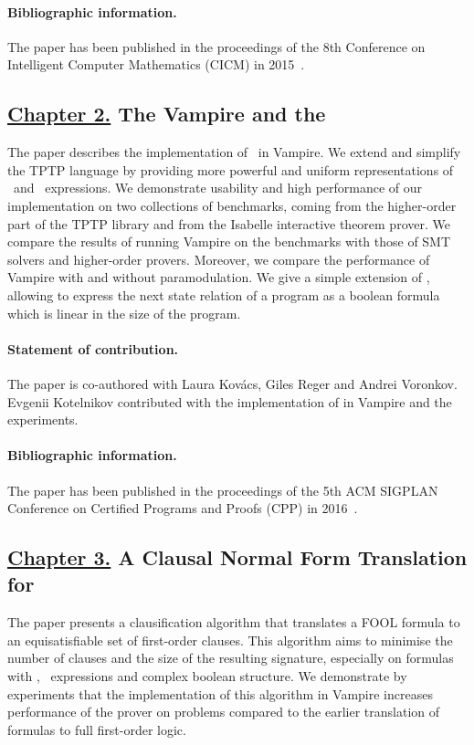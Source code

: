 \paragraph{Bibliographic information.} The paper has been published in the proceedings of the 8th Conference on Intelligent Computer Mathematics (CICM) in 2015~\cite{FOOL}.

\subsection*{\hyperref[chap:implementation]{Chapter 2.} The Vampire and the \folb{}}
The paper describes the implementation of \folb\ in Vampire. We extend and simplify the TPTP language by providing more powerful and uniform representations of \ITE\ and \LETIN\ expressions. We demonstrate usability and high performance of our implementation on two collections of benchmarks, coming from the higher-order part of the TPTP library and from the Isabelle interactive theorem prover. We compare the results of running Vampire on the benchmarks with those of SMT solvers and higher-order provers. Moreover, we compare the performance of Vampire with and without \folb{} paramodulation. We give a simple extension of \folb, allowing to express the next state relation of a program as a boolean formula which is linear in the size of the program.

\paragraph{Statement of contribution.} The paper is co-authored with Laura Kov\'{a}cs, Giles Reger and Andrei Voronkov. Evgenii Kotelnikov contributed with the implementation of \folb{} in Vampire and the experiments.

\paragraph{Bibliographic information.} The paper has been published in the proceedings of the 5th ACM SIGPLAN Conference on Certified Programs and Proofs (CPP) in 2016~\cite{VampireAndFOOL}.

\subsection*{\hyperref[chap:cnf]{Chapter 3.} A Clausal Normal Form Translation\\for \folb{}}
The paper presents a clausification algorithm that translates a FOOL formula to an equisatisfiable set of first-order clauses. This algorithm aims to minimise the number of clauses and the size of the resulting signature, especially on formulas with \ITE, \LETIN\ expressions and complex boolean structure. We demonstrate by experiments that the implementation of this algorithm in Vampire increases performance of the prover on \folb{} problems compared to the earlier translation of \folb{} formulas to full first-order logic.

